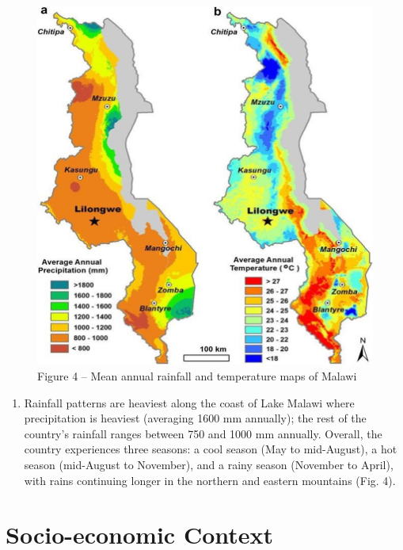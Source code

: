 \documentclass[
]{book}
\providecommand{\tightlist}{%
  \setlength{\itemsep}{0pt}\setlength{\parskip}{0pt}}
\begin{document}
\begin{figure}
\centering
\includegraphics{images/rain_temp_from_met.png}
\caption{Figure 4 -- Mean annual rainfall and temperature maps of Malawi}
\end{figure}

\begin{enumerate}
\def\labelenumi{\arabic{enumi}.}
\setcounter{enumi}{19}
\tightlist
\item
  Rainfall patterns are heaviest along the coast of Lake Malawi where precipitation is heaviest (averaging 1600 mm annually); the rest of the country's rainfall ranges between 750 and 1000 mm annually. Overall, the country experiences three seasons: a cool season (May to mid-August), a hot season (mid-August to November), and a rainy season (November to April), with rains continuing longer in the northern and eastern mountains (Fig. 4).
\end{enumerate}

\hypertarget{socio-economic-context}{%
\section{Socio-economic Context}\label{socio-economic-context}}
\end{document}

